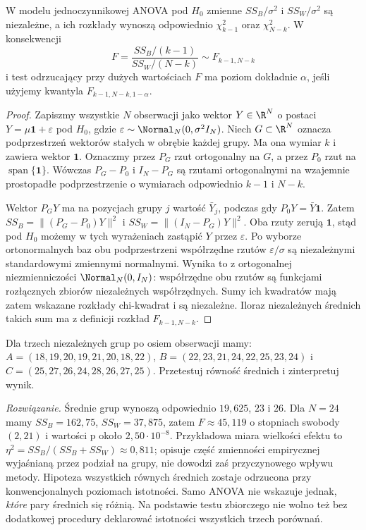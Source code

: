 \begin{twierdzenie}
\label{thm:anova-f}
W modelu jednoczynnikowej ANOVA pod $H_0$ zmienne
$SS_B/\sigma^2$ i $SS_W/\sigma^2$ są niezależne,
a ich rozkłady wynoszą odpowiednio $\chi^2_{k-1}$
oraz $\chi^2_{N-k}$. W konsekwencji
\[
 F=\frac{SS_B/(k-1)}{SS_W/(N-k)}\sim F_{k-1,N-k}
\]
i test odrzucający przy dużych wartościach $F$ ma
poziom dokładnie $\alpha$, jeśli użyjemy kwantyla
$F_{k-1,N-k,1-\alpha}$.
\end{twierdzenie}
\begin{proof}
Zapiszmy wszystkie $N$ obserwacji jako wektor
$Y\in\R^N$ o postaci $Y=\mu\mathbf1+\varepsilon$
pod $H_0$, gdzie $\varepsilon\sim\Normal_N(0,\sigma^2I_N)$.
Niech $G\subset\R^N$ oznacza podprzestrzeń wektorów
stałych w obrębie każdej grupy. Ma ona wymiar $k$ i zawiera
wektor $\mathbf1$. Oznaczmy przez $P_G$ rzut
ortogonalny na $G$, a przez $P_0$ rzut na
$\operatorname{span}\{\mathbf1\}$. Wówczas
$P_G-P_0$ i $I_N-P_G$ są rzutami ortogonalnymi na
wzajemnie prostopadłe podprzestrzenie o wymiarach
odpowiednio $k-1$ i $N-k$.

Wektor $P_GY$ ma na pozycjach grupy $j$ wartość
$\bar Y_j$, podczas gdy $P_0Y=\bar Y\mathbf1$.
Zatem $SS_B=\|(P_G-P_0)Y\|^2$ i
$SS_W=\|(I_N-P_G)Y\|^2$.
Oba rzuty zerują $\mathbf1$, stąd pod $H_0$ możemy w tych
wyrażeniach zastąpić $Y$ przez $\varepsilon$.
Po wyborze ortonormalnych baz obu podprzestrzeni
współrzędne rzutów $\varepsilon/\sigma$ są niezależnymi
standardowymi zmiennymi normalnymi. Wynika to z
ortogonalnej niezmienniczości $\Normal_N(0,I_N)$:
współrzędne obu rzutów są funkcjami rozłącznych zbiorów
niezależnych współrzędnych. Sumy ich kwadratów mają
zatem wskazane rozkłady chi-kwadrat i są niezależne.
Iloraz niezależnych średnich takich sum ma z definicji
rozkład $F_{k-1,N-k}$.
\end{proof}

\begin{zadanie}\label{zad:anova-three}
Dla trzech niezależnych grup po osiem obserwacji mamy:
$A=(18,19,20,19,21,20,18,22)$,
$B=(22,23,21,24,22,25,23,24)$ i
$C=(25,27,26,24,28,26,27,25)$.
Przetestuj równość średnich i zinterpretuj wynik.
\par\emph{Rozwiązanie.} Średnie grup wynoszą odpowiednio
$19{,}625$, $23$ i $26$. Dla $N=24$ mamy $SS_B=162{,}75$, $SS_W=37{,}875$,
zatem $F\approx45{,}119$ o stopniach swobody $(2,21)$ i
wartości p około $2{,}50\cdot10^{-8}$.
Przykładowa miara wielkości efektu to
$\eta^2=SS_B/(SS_B+SS_W)\approx0{,}811$; opisuje część
zmienności empirycznej wyjaśnianą przez podział na grupy,
nie dowodzi zaś przyczynowego wpływu metody.
Hipoteza wszystkich równych średnich zostaje odrzucona przy
konwencjonalnych poziomach istotności. Samo ANOVA nie
wskazuje jednak, \emph{które} pary średnich się różnią.
Na podstawie testu zbiorczego nie wolno też bez dodatkowej
procedury deklarować istotności wszystkich trzech porównań.
\end{zadanie}

